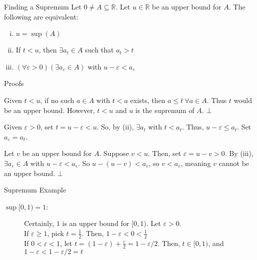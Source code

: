 \documentclass[8pt]{extarticle}
\newcommand{\R}{\mathbb{R}}
\begin{document}
  \begin{problem}{Finding a Supremum}
    Let $0\neq A\subseteq \R$. Let $u\in\R$ be an upper bound for $A$. The following are equivalent:
    \begin{enumerate}[(i)]
      \item $u=\sup(A)$
      \item If $t<u$, then $\exists a_t\in A$ such that $a_t > t$
      \item $(\forall \varepsilon > 0)(\exists a_{\varepsilon}\in A)$ with $u-\varepsilon < a_{\varepsilon}$
    \end{enumerate}
    \begin{problem}{Proofs}
      \begin{description}[font=\normalfont]
        \item[(i) $\Rightarrow$ (ii):] Given $t < u$, if no such $a\in A$ with $t < a$ exists, then $a \leq t~\forall a\in A$. Thus $t$ would be an upper bound. However, $t < u$ and $u$ is the supremum of $A$. $\bot$
        \item[(ii) $\Rightarrow$ (iii):] Given $\varepsilon > 0$, set $t = u-\varepsilon < u$. So, by (ii), $\exists a_t$ with $t < a_t$. Thus, $u-\varepsilon \leq a_t$. Set $a_{\varepsilon} = a_t$.
        \item[(iii) $\Rightarrow$ (i):] Let $v$ be an upper bound for $A$. Suppose $v < u$. Then, set $\varepsilon = u-v > 0$. By (iii), $\exists a_{\varepsilon}\in A$ with $u-\varepsilon < a_{\varepsilon}$. So $u-(u-v) < a_{\varepsilon}$, so $v < a_{\varepsilon}$, meaning $v$ cannot be an upper bound. $\bot$
      \end{description}
    \end{problem}
  \end{problem}
  \begin{problem}{Supremum Example}
    \begin{description}
      \item[$\sup [0,1) = 1$:] Certainly, $1$ is an upper bound for $[0,1)$. Let $\varepsilon > 0$.\\

        If $\varepsilon \geq 1$, pick $t = \frac{1}{2}$. Then, $1-\varepsilon < 0 < \frac{1}{2}$\\

        If $0 < \varepsilon < 1$, let $t = (1-\varepsilon) + \frac{\varepsilon}{2} = 1-\varepsilon/2$. Then, $t\in [0,1)$, and $1-\varepsilon < 1-\varepsilon/2 = t$
    \end{description}
  \end{problem}
\end{document}
